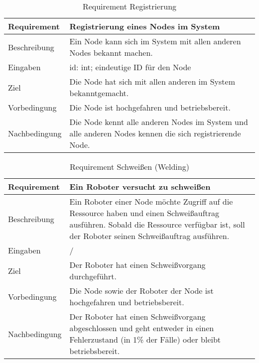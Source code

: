 \begin{table}[h!]
\begin{center}
\begin{tabular}{ |p{2.5cm}|p{11cm}| } 
 \hline
 Requirement & Registrierung eines Nodes im System \\
 \hline
 Beschreibung & Ein Node kann sich im System mit allen anderen Nodes bekannt machen. \\
 \hline
 Eingaben & id: int; eindeutige ID für den Node \\
 \hline
 Ziel & Die Node hat sich mit allen anderen im System bekanntgemacht. \\
 \hline
 Vorbedingung & Die Node ist hochgefahren und betriebsbereit. \\
 \hline
 Nachbedingung & Die Node kennt alle anderen Nodes im System und alle anderen Nodes kennen die sich 
 registrierende Node. \\
 \hline
\end{tabular}
\caption{Requirement Registrierung}
\label{table:reqregister}
\end{center}
\end{table}

\begin{table}[h!]
\begin{center}
\begin{tabular}{ |p{2.5cm}|p{11cm}| } 
 \hline
 Requirement & Ein Roboter versucht zu schweißen \\
 \hline
 Beschreibung & Ein Roboter einer Node möchte Zugriff auf die Ressource haben und einen Schweißauftrag
 ausführen. Sobald die Ressource verfügbar ist, soll der Roboter seinen Schweißauftrag ausführen.\\
 \hline
 Eingaben & / \\
 \hline
 Ziel & Der Roboter hat einen Schweißvorgang durchgeführt. \\
 \hline
 Vorbedingung & Die Node sowie der Roboter der Node ist hochgefahren und betriebsbereit. \\
 \hline
 Nachbedingung & Der Roboter hat einen Schweißvorgang abgeschlossen und geht entweder in einen Fehlerzustand
 (in 1\% der Fälle) oder bleibt betriebsbereit. \\
 \hline
\end{tabular}
\caption{Requirement Schweißen (Welding)}
\label{table:reqwelding}
\end{center}
\end{table}

